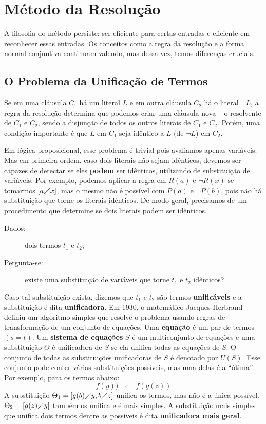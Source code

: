 \section{Método da Resolução}

A filosofia do método persiste: ser eficiente para certas entradas e eficiente em reconhecer essas entradas. Os conceitos como a regra da resolução e a forma normal conjuntiva continuam valendo, mas dessa vez, temos diferenças cruciais.
\subsection{O Problema da Unificação de Termos}
Se em uma cláusula $C_1$ há um literal $L$ e em outra cláusula $C_2$ há o literal $\neg L$, a regra da resolução determina que podemos criar uma cláusula nova -- o resolvente de $C_1$ e $C_2$, sendo a disjunção de todos os outros literais de $C_1$ e $C_2$. Porém, uma condição importante é que $L$ em $C_1$ seja idêntico a $L$ (de $\neg L$) em $C_2$.

Em lógica proposicional, esse problema é trivial pois avaliamos apenas variáveis. Mas em primeira ordem, caso dois literais não sejam idênticos, devemos ser capazes de detectar se eles \textbf{podem} ser idênticos, utilizando de substituição de variáveis. Por exemplo, podemos aplicar a regra em $R(a)$ e $\neg R(x)$ se tomarmos $[a\diagup x]$, mas o mesmo não é possível com $P(a)$ e $\neg P(b)$, pois não há substituição que torne os literais idênticos. De modo geral, precisamos de um procedimento que determine se dois literais podem ser idênticos.

\begin{description}
    \item[Dados:] dois termos $t_1$ e $t_2$;
    \item[Pergunta-se:] existe uma substituição de variáveis que torne $t_1$ e $t_2$ idênticos? 
\end{description}

Caso tal substituição exista, dizemos que $t_1$ e $t_2$ são termos \textbf{unificáveis} e a substituição é dita \textbf{unificadora}. Em 1930, o matemático Jacques Herbrand definiu um algoritmo simples que resolve o problema usando regras de transformação de um conjunto de equações. Uma \textbf{equação} é um par de termos $(s = t)$. Um \textbf{sistema de equações} $S$ é um multiconjunto de equações e uma substituição $\Theta$ é unificadora de $S$ se ela unifica todas as equações de $S$. O conjunto de todas as substituições unificadoras de $S$ é denotado por $U(S)$. Esse conjunto pode conter várias substituições possíveis, mas uma delas é a ``ótima''. Por exemplo, para os termos abaixo:
\[f(y))\quad\text{e}\quad f(g(z))\]
A substituição $\Theta_1 = [g(b)\diagup y, b\diagup z]$ unifica os termos, mas não é a única possível. $\Theta_2 = [g(z)\diagup y]$ também os unifica e é mais simples. A substituição mais simples que unifica dois termos dentre as possíveis é dita \textbf{unificadora mais geral}.

